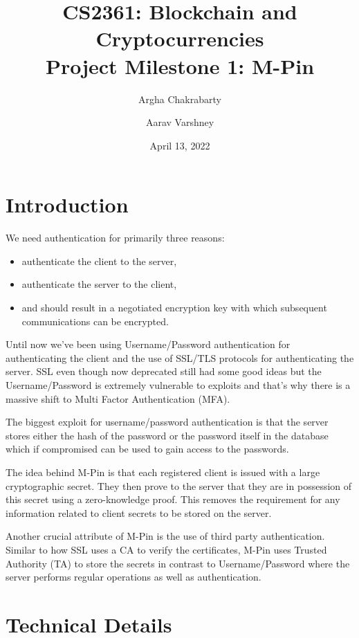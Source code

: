 \documentclass[]{article}   %
\begin{document}
\title{CS2361: Blockchain and Cryptocurrencies\\ Project Milestone 1: M-Pin}   %
\author{Argha Chakrabarty \and Aarav Varshney}         %
\date{April 13, 2022}    %
\maketitle

\section*{Introduction}
We need authentication for primarily three reasons:
\begin{itemize}
    \itemsep0em
    \item authenticate the client to the server,
    \item authenticate the server to the client,
    \item and should result in a negotiated encryption key with which subsequent communications can be encrypted.
\end{itemize}
Until now we've been using Username/Password authentication for authenticating the client and the use of SSL/TLS protocols for authenticating the server. SSL even though now deprecated still had some good ideas but the Username/Password is extremely vulnerable to exploits and that's why there is a massive shift to Multi Factor Authentication (MFA).

The biggest exploit for username/password authentication is that the server stores either the hash of the password or the password itself in the database which if compromised can be used to gain access to the passwords.

The idea behind M-Pin is that each registered client is issued with a large cryptographic secret. They then prove to the server that they are in possession of this secret using a zero-knowledge proof. This removes the requirement for any information related to client secrets to be stored on the server.

Another crucial attribute of M-Pin is the use of third party authentication. Similar to how SSL uses a CA to verify the certificates, M-Pin uses Trusted Authority (TA) to store the secrets in contrast to Username/Password where the server performs regular operations as well as authentication.

\newpage
\section*{Technical Details}
\end{document}
